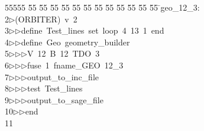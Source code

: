 %
%
\begin{tabbing}
55555 \= 55 \= 55 \= 55 \= 55 \= 55 \= 55 \= 55 \= 55 \= 55 \= 55 \= 55 \= 55 \= \>geo\_12\_3:\\[0pt]
2\>$\triangleright$\>(ORBITER)\ v\ 2\ \\[0pt]
3\>$\triangleright$\>$\triangleright$\>define\ Test\_lines\ set\ loop\ 4\ 13\ 1\ end\ \\[0pt]
4\>$\triangleright$\>$\triangleright$\>define\ Geo\ geometry\_builder\ \\[0pt]
5\>$\triangleright$\>$\triangleright$\>$\triangleright$\>V\ 12\ B\ 12\ TDO\ 3\ \\[0pt]
6\>$\triangleright$\>$\triangleright$\>$\triangleright$\>fuse\ 1\ fname\_GEO\ 12\_3\ \\[0pt]
7\>$\triangleright$\>$\triangleright$\>$\triangleright$\>output\_to\_inc\_file\ \\[0pt]
8\>$\triangleright$\>$\triangleright$\>$\triangleright$\>test\ Test\_lines\ \\[0pt]
9\>$\triangleright$\>$\triangleright$\>$\triangleright$\>output\_to\_sage\_file\ \\[0pt]
10\>$\triangleright$\>$\triangleright$\>end\\[0pt]
11\>\end{tabbing}
